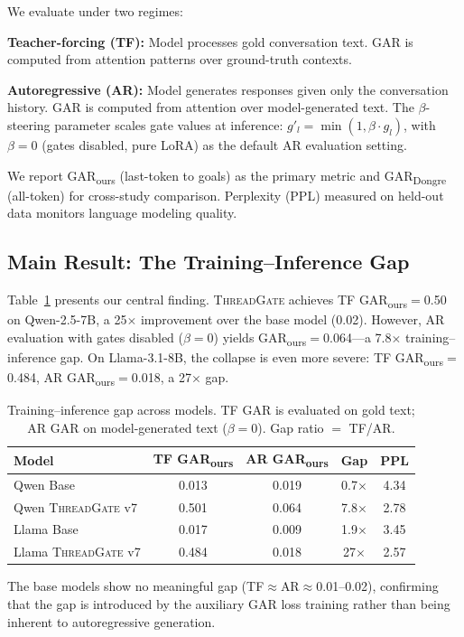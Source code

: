 \documentclass[11pt]{article}
\newcommand{\gar}{\textsc{GAR}}
\newcommand{\garours}{\textsc{GAR}\textsubscript{ours}}
\newcommand{\gardongre}{\textsc{GAR}\textsubscript{Dongre}}
\newcommand{\tg}{\textsc{ThreadGate}}
\begin{document}
We evaluate under two regimes:

\textbf{Teacher-forcing (TF):} Model processes gold conversation text. \gar{} is computed from attention patterns over ground-truth contexts.

\textbf{Autoregressive (AR):} Model generates responses given only the conversation history. \gar{} is computed from attention over model-generated text. The $\beta$-steering parameter scales gate values at inference: $g'_l = \min(1, \beta \cdot g_l)$, with $\beta=0$ (gates disabled, pure LoRA) as the default AR evaluation setting.

We report \garours{} (last-token to goals) as the primary metric and \gardongre{} (all-token) for cross-study comparison. Perplexity (PPL) measured on held-out data monitors language modeling quality.

\subsection{Main Result: The Training--Inference Gap}
\label{sec:main_result}

Table~\ref{tab:main_gap} presents our central finding. \tg{} achieves TF \garours{}$=$0.50 on Qwen-2.5-7B, a 25$\times$ improvement over the base model (0.02). However, AR evaluation with gates disabled ($\beta=0$) yields \garours{}$=$0.064---a 7.8$\times$ training--inference gap. On Llama-3.1-8B, the collapse is even more severe: TF \garours{}$=$0.484, AR \garours{}$=$0.018, a 27$\times$ gap.

\begin{table}[t]
\centering
\small
\caption{Training--inference gap across models. TF \gar{} is evaluated on gold text; AR \gar{} on model-generated text ($\beta=0$). Gap ratio $=$ TF/AR.}
\label{tab:main_gap}
\begin{tabular}{lcccc}
\toprule
\textbf{Model} & \textbf{TF \garours{}} & \textbf{AR \garours{}} & \textbf{Gap} & \textbf{PPL} \\
\midrule
Qwen Base & 0.013 & 0.019 & 0.7$\times$ & 4.34 \\
Qwen \tg{} v7 & 0.501 & 0.064 & 7.8$\times$ & 2.78 \\
Llama Base & 0.017 & 0.009 & 1.9$\times$ & 3.45 \\
Llama \tg{} v7 & 0.484 & 0.018 & 27$\times$ & 2.57 \\
\bottomrule
\end{tabular}
\end{table}

The base models show no meaningful gap (TF$\approx$AR$\approx$0.01--0.02), confirming that the gap is introduced by the auxiliary \gar{} loss training rather than being inherent to autoregressive generation.
\end{document}
